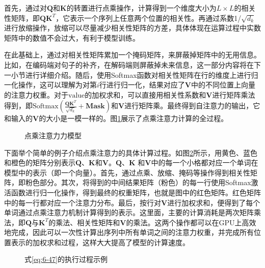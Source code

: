 \noindent 首先，通过对$\mathbf{Q}$和$\mathbf{K}$的转置进行点乘操作，计算得到一个维度大小为$L \times L$的相关性矩阵，即$\mathbf{Q}\mathbf{K}^{T}$，它表示一个序列上任意两个位置的相关性。再通过系数1/$\sqrt{d_k}$进行放缩操作，放缩可以尽量减少相关性矩阵的方差，具体体现在运算过程中实数矩阵中的数值不会过大，有利于模型训练。

\parinterval 在此基础上，通过对相关性矩阵累加一个掩码矩阵，来屏蔽掉矩阵中的无用信息。比如，在编码端对句子的补齐，在解码端则屏蔽掉未来信息，这一部分内容将在下一小节进行详细介绍。随后，使用Softmax函数对相关性矩阵在行的维度上进行归一化操作，这可以理解为对第$i$行进行归一化，结果对应了$\mathbf{V}$中的不同位置上向量的注意力权重。对于$\mathrm{value}$的加权求和，可以直接用相关性系数和$\mathbf{V}$进行矩阵乘法得到，即$\textrm{Softmax}
 ( \frac{\mathbf{Q}\mathbf{K}^{T}} {\sqrt{d_k}} + \mathbf{Mask} )$和$\mathbf{V}$进行矩阵乘。最终得到自注意力的输出，它和输入的$\mathbf{V}$的大小是一模一样的。图\ref{fig:6-45}展示了点乘注意力计算的全过程。

\begin{figure}[htp]
\centering

\caption{点乘注意力力模型 }
\label{fig:6-45}
\end{figure}

\parinterval 下面举个简单的例子介绍点乘注意力的具体计算过程。如图\ref{fig:6-46}所示，用黄色、蓝色和橙色的矩阵分别表示$\mathbf{Q}$、$\mathbf{K}$和$\mathbf{V}$。$\mathbf{Q}$、$\mathbf{K}$ 和$\mathbf{V}$中的每一个小格都对应一个单词在模型中的表示（即一个向量）。首先，通过点乘、放缩、掩码等操作得到相关性矩阵，即粉色部分。其次，将得到的中间结果矩阵（粉色）的每一行使用Softmax激活函数进行归一化操作，得到最终的权重矩阵，也就是图中的红色矩阵。红色矩阵中的每一行都对应一个注意力分布。最后，按行对$\mathbf{V}$进行加权求和，便得到了每个单词通过点乘注意力机制计算得到的表示。这里面，主要的计算消耗是两次矩阵乘法，即$\mathbf{Q}$与$\mathbf{K}^{T}$的乘法、相关性矩阵和$\mathbf{V}$的乘法。这两个操作都可以在GPU上高效地完成，因此可以一次性计算出序列中所有单词之间的注意力权重，并完成所有位置表示的加权求和过程，这样大大提高了模型的计算速度。

\begin{figure}[htp]
\centering

\caption{式\ref{eq:6-47}的执行过程示例}
\label{fig:6-46}
\end{figure}


